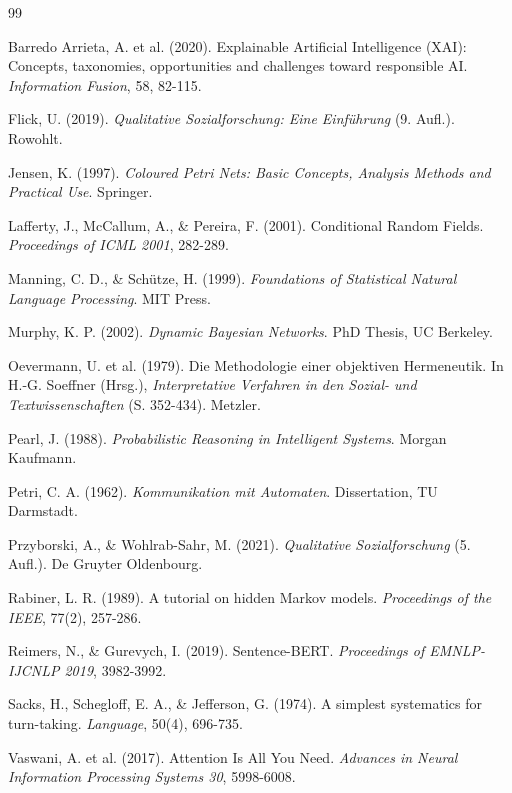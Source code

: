 \documentclass[12pt,a4paper]{article}
\begin{document}
\newpage
\begin{thebibliography}{99}

Barredo Arrieta, A. et al. (2020). Explainable Artificial Intelligence (XAI): 
Concepts, taxonomies, opportunities and challenges toward responsible AI. 
\textit{Information Fusion}, 58, 82-115.

Flick, U. (2019). \textit{Qualitative Sozialforschung: Eine Einführung} (9. Aufl.). 
Rowohlt.

Jensen, K. (1997). \textit{Coloured Petri Nets: Basic Concepts, Analysis Methods 
and Practical Use}. Springer.

Lafferty, J., McCallum, A., \& Pereira, F. (2001). Conditional Random Fields. 
\textit{Proceedings of ICML 2001}, 282-289.

Manning, C. D., \& Schütze, H. (1999). \textit{Foundations of Statistical Natural 
Language Processing}. MIT Press.

Murphy, K. P. (2002). \textit{Dynamic Bayesian Networks}. PhD Thesis, UC Berkeley.

Oevermann, U. et al. (1979). Die Methodologie einer objektiven Hermeneutik. 
In H.-G. Soeffner (Hrsg.), \textit{Interpretative Verfahren in den Sozial- und 
Textwissenschaften} (S. 352-434). Metzler.

Pearl, J. (1988). \textit{Probabilistic Reasoning in Intelligent Systems}. 
Morgan Kaufmann.

Petri, C. A. (1962). \textit{Kommunikation mit Automaten}. Dissertation, TU Darmstadt.

Przyborski, A., \& Wohlrab-Sahr, M. (2021). \textit{Qualitative Sozialforschung} 
(5. Aufl.). De Gruyter Oldenbourg.

Rabiner, L. R. (1989). A tutorial on hidden Markov models. 
\textit{Proceedings of the IEEE}, 77(2), 257-286.

Reimers, N., \& Gurevych, I. (2019). Sentence-BERT. \textit{Proceedings of 
EMNLP-IJCNLP 2019}, 3982-3992.

Sacks, H., Schegloff, E. A., \& Jefferson, G. (1974). A simplest systematics 
for turn-taking. \textit{Language}, 50(4), 696-735.

Vaswani, A. et al. (2017). Attention Is All You Need. 
\textit{Advances in Neural Information Processing Systems 30}, 5998-6008.

\end{thebibliography}
\end{document}
